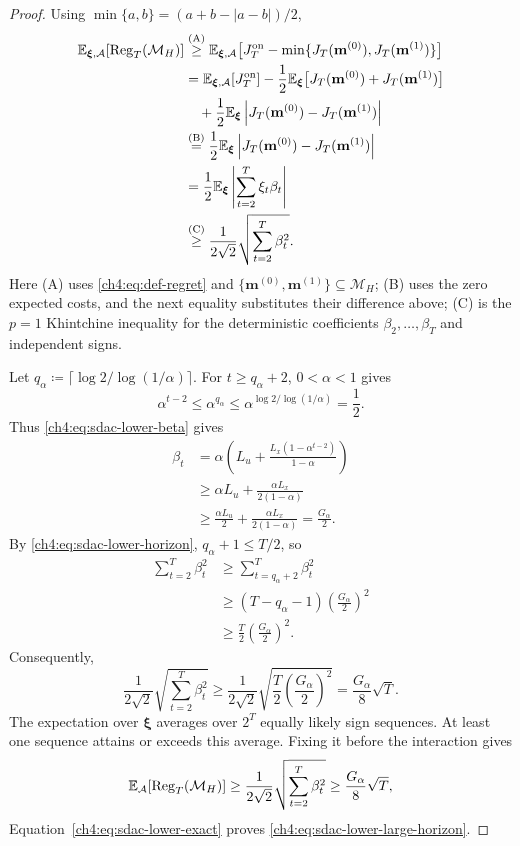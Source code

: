 \begin{proof}
Using $\min\{a,b\}=(a+b-|a-b|)/2$,
\[
\begin{aligned}
\mathbb E_{\boldsymbol\xi,\mathcal A}[\mathrm{Reg}_T(\mathcal M_H)]
&\overset{\mathrm{(A)}}{\ge}
 \mathbb E_{\boldsymbol\xi,\mathcal A}
 \bigl[J_T^{\mathrm{on}}-\min\{J_T(\mathbf m^{(0)}),J_T(\mathbf m^{(1)})\}\bigr]\\
&=\mathbb E_{\boldsymbol\xi,\mathcal A}[J_T^{\mathrm{on}}]
 -\frac12\mathbb E_{\boldsymbol\xi}
 \bigl[J_T(\mathbf m^{(0)})+J_T(\mathbf m^{(1)})\bigr]\\
&\quad+\frac12\mathbb E_{\boldsymbol\xi}
 \left|J_T(\mathbf m^{(0)})-J_T(\mathbf m^{(1)})\right|\\
&\overset{\mathrm{(B)}}{=}\frac12\mathbb E_{\boldsymbol\xi}
 \left|J_T(\mathbf m^{(0)})-J_T(\mathbf m^{(1)})\right|\\
&=\frac12\mathbb E_{\boldsymbol\xi}
\left|\sum_{t=2}^T\xi_t\beta_t\right|\\
&\overset{\mathrm{(C)}}{\ge}\frac{1}{2\sqrt2}\sqrt{\sum_{t=2}^T\beta_t^2}.
\end{aligned}
\]
Here (A) uses \eqref{ch4:eq:def-regret} and
$\{\mathbf m^{(0)},\mathbf m^{(1)}\}\subseteq\mathcal M_H$;
(B) uses the zero expected costs, and the next equality substitutes
their difference above;
(C) is the $p=1$ Khintchine inequality \cite{szarek1976best} for the
deterministic coefficients $\beta_2,\ldots,\beta_T$ and independent signs.

Let $q_\alpha\coloneqq\lceil\log2/\log(1/\alpha)\rceil$.
For $t\ge q_\alpha+2$, $0<\alpha<1$ gives
\[
\alpha^{t-2}\le\alpha^{q_\alpha}
\le\alpha^{\log2/\log(1/\alpha)}=\frac12.
\]
Thus \eqref{ch4:eq:sdac-lower-beta} gives
\[
\begin{aligned}
\beta_t
&=\alpha\left(L_u+\frac{L_x(1-\alpha^{t-2})}{1-\alpha}\right)\\
&\ge\alpha L_u+\frac{\alpha L_x}{2(1-\alpha)}\\
&\ge\frac{\alpha L_u}{2}+\frac{\alpha L_x}{2(1-\alpha)}
 =\frac{G_\alpha}{2}.
\end{aligned}
\]
By \eqref{ch4:eq:sdac-lower-horizon}, $q_\alpha+1\le T/2$, so
\[
\begin{aligned}
\sum_{t=2}^T\beta_t^2
&\ge\sum_{t=q_\alpha+2}^T\beta_t^2\\
&\ge(T-q_\alpha-1)\left(\frac{G_\alpha}{2}\right)^2\\
&\ge\frac T2\left(\frac{G_\alpha}{2}\right)^2.
\end{aligned}
\]
Consequently,
\[
\frac{1}{2\sqrt2}\sqrt{\sum_{t=2}^T\beta_t^2}
\ge\frac{1}{2\sqrt2}\sqrt{\frac T2\left(\frac{G_\alpha}{2}\right)^2}
=\frac{G_\alpha}{8}\sqrt T.
\]
The expectation over $\boldsymbol\xi$ averages over $2^T$ equally likely
sign sequences. At least one sequence attains or exceeds this average.
Fixing it before the interaction gives
\begin{equation}
\label{ch4:eq:sdac-lower-exact}
\mathbb E_{\mathcal A}\!\left[\mathrm{Reg}_T(\mathcal M_H)\right]
\ge\frac{1}{2\sqrt2}\sqrt{\sum_{t=2}^T\beta_t^2}
\ge\frac{G_\alpha}{8}\sqrt T,
\end{equation}
Equation~\eqref{ch4:eq:sdac-lower-exact} proves
\eqref{ch4:eq:sdac-lower-large-horizon}.
\end{proof}

